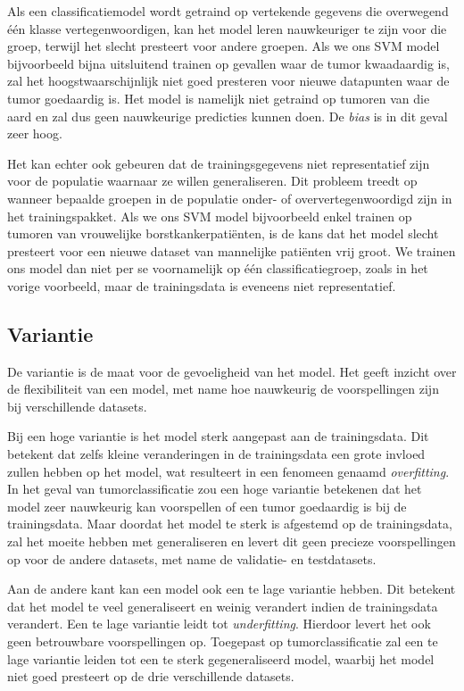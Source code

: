\documentclass[twoside, kulak]{kulakreport}
\begin{document}
	\newpage
	
	Als een classificatiemodel wordt getraind op vertekende gegevens die overwegend één klasse vertegenwoordigen, kan het model leren nauwkeuriger te zijn voor die groep, terwijl het slecht presteert voor andere groepen. Als we ons SVM model bijvoorbeeld bijna uitsluitend trainen op gevallen waar de tumor kwaadaardig is, zal het hoogstwaarschijnlijk niet goed presteren voor nieuwe datapunten waar de tumor goedaardig is. Het model is namelijk niet getraind op tumoren van die aard en zal dus geen nauwkeurige predicties kunnen doen. De \textit{bias} is in dit geval zeer hoog.
	
	Het kan echter ook gebeuren dat de trainingsgegevens niet representatief zijn voor de populatie waarnaar ze willen generaliseren. Dit probleem treedt op wanneer bepaalde groepen in de populatie onder- of oververtegenwoordigd zijn in het trainingspakket. Als we ons SVM model bijvoorbeeld enkel trainen op tumoren van vrouwelijke borstkankerpatiënten, is de kans dat het model slecht presteert voor een nieuwe dataset van mannelijke patiënten vrij groot. We trainen ons model dan niet per se voornamelijk op één classificatiegroep, zoals in het vorige voorbeeld, maar de trainingsdata is eveneens niet representatief.
	
	\subsection{Variantie}
	
	De variantie is de maat voor de gevoeligheid van het model. Het geeft inzicht over de flexibiliteit van een model, met name hoe nauwkeurig de voorspellingen zijn bij verschillende datasets.
	
	Bij een hoge variantie is het model sterk aangepast aan de trainingsdata. Dit betekent dat zelfs kleine veranderingen in de trainingsdata een grote invloed zullen hebben op het model, wat resulteert in een fenomeen genaamd \textit{overfitting}. In het geval van tumorclassificatie zou een hoge variantie betekenen dat het model zeer nauwkeurig kan voorspellen of een tumor goedaardig is bij de trainingsdata. Maar doordat het model te sterk is afgestemd op de trainingsdata, zal het moeite hebben met generaliseren en levert dit geen precieze voorspellingen op voor de andere datasets, met name de validatie- en testdatasets.
	
	Aan de andere kant kan een model ook een te lage variantie hebben. Dit betekent dat het model te veel generaliseert en weinig verandert indien de trainingsdata verandert. Een te lage variantie leidt tot \textit{underfitting}. Hierdoor levert het ook geen betrouwbare voorspellingen op. Toegepast op tumorclassificatie zal een te lage variantie leiden tot een te sterk gegeneraliseerd model, waarbij het model niet goed presteert op de drie verschillende datasets.
	
\end{document}
